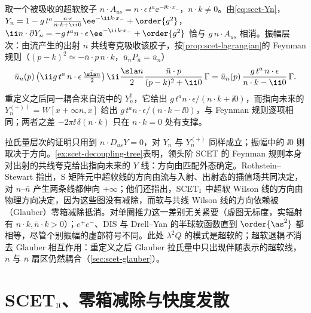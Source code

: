 \begin{example}\label{ex:scet-decoupling-tree}
取一个被吸收的超软胶子 $n\cdot A_{us}=n\cdot\epsilon\,t^a\ee^{-\ii k\cdot x_-}$，$n\cdot k\neq0$。由\cref{eq:scet-Yn}，$Y_n=1-g\,t^a\frac{n\cdot\epsilon}{n\cdot k+\ii0}\ee^{-\ii k\cdot x_-}+\order{g^2}$，$\ii n\cdot\partial Y_n=-g\,t^an\cdot\epsilon\,\ee^{-\ii k\cdot x_-}+\order{g^2}$ 恰与 $g\,n\cdot A_{us}$ 相消。振幅层次：由流产生的出射 $n$ 共线夸克吸收该胶子，按\cref{prop:scet-lagrangian}的 Feynman 规则（$(p-k)^2\simeq-\bar n\cdot p\,n\cdot k$，$\bar u_nP_{\bar n}=\bar u_n$）
\[
\bar u_n(p)\,\big(\ii g\,t^a\,n\cdot\epsilon\,\tfrac{\bar{\sla n}}{2}\big)\,\ii\frac{\sla n}{2}\frac{\bar n\cdot p}{(p-k)^2+\ii0}\,\Gamma=\bar u_n(p)\,\frac{g\,t^a\,n\cdot\epsilon}{n\cdot k-\ii0}\,\Gamma .
\]
重定义之后同一耦合来自流中的 $Y_n^\dagger$，它给出 $g\,t^a n\cdot\epsilon/(n\cdot k+\ii0)$，而指向未来的 $Y_n^{(+)\dagger}=W[x+\infty n,x]$ 给出 $g\,t^an\cdot\epsilon/(n\cdot k-\ii0)$，与 Feynman 规则逐项相同；两者之差 $-2\pi\ii\,\delta(n\cdot k)$ 只在 $n\cdot k=0$ 处有支撑。%
\end{example}

\begin{remark}[$Y_n$ 的方向与 $\ii0$]\label{rem:scet-y-direction}
拉氏量层次的证明只用到 $n\cdot D_{us}Y=0$，对 $Y_n$ 与 $Y_n^{(+)}$ 同样成立；振幅中的 $\ii0$ 则取决于方向。\cref{ex:scet-decoupling-tree}表明，领头阶 SCET 的 Feynman 规则本身对出射的共线夸克给出指向未来的 $Y$ 线：方向由匹配外态确定\cite{Chay:2004zn}。Rothstein--Stewart 指出，S 矩阵元中超软线的方向由流与入射、出射态的插值场共同决定，对 $n$–$\bar n$ 产生两条线都伸向 $+\infty$\cite[第~10.1~节]{RothsteinStewart2016}；他们还指出，SCET$_{\rm I}$ 中超软 Wilson 线的方向由物理方向决定，因为这些图没有减除，而软与共线 Wilson 线的方向依赖被（Glauber）零箱减除抵消\cite[第~4.2~节]{RothsteinStewart2016}。对单圈推力这一差别无关紧要（虚图无标度，实辐射有 $n\cdot k,\bar n\cdot k>0$）；$e^+e^-$、DIS 与 Drell--Yan 的半球软函数直到 $\order{\as^2}$ 都相等，尽管个别振幅的虚部符号不同\cite{Kang:2015moa}。此处 $\lambda^2Q$ 的模式是超软的；超软退耦\emph{不}消去 Glauber 相互作用：重定义之后 Glauber 拉氏量中只出现伴随表示的超软线，$n$ 与 $\bar n$ 扇区仍然耦合\cite[第~5.1~节]{RothsteinStewart2016}（\cref{sec:scet-glauber}）。
\end{remark}

\section{SCET\texorpdfstring{$_{\rm II}$}{II}、零箱减除与快度发散}\label{sec:scet-scet2}

